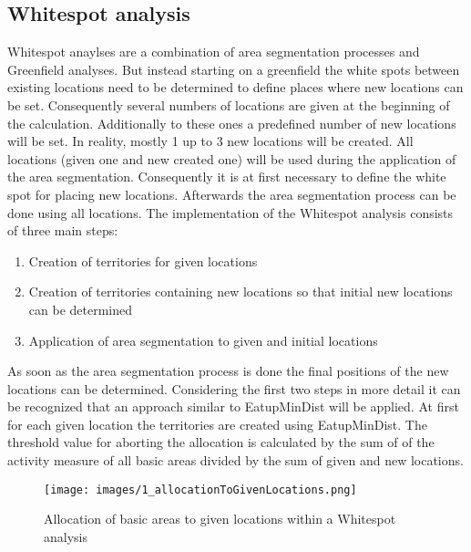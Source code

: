\subsection{Whitespot analysis}

Whitespot anaylses are a combination of area segmentation processes and Greenfield analyses. But instead starting on a greenfield the white spots between existing locations need to be determined to define places where new locations can be set. Consequently several numbers of locations are given at the beginning of the calculation. Additionally to these ones a predefined number of new locations will be set. In reality, mostly 1 up to 3 new locations will be created. All locations (given one and new created one) will be used during the application of the area segmentation. Consequently it is at first necessary to define the white spot for placing new locations. Afterwards the area segmentation process can be done using all locations. The implementation of the Whitespot analysis consists of three main steps:

\begin{enumerate}
	\item Creation of territories for given locations
	\item Creation of territories containing new locations so that initial new locations can be determined
	\item Application of area segmentation to given and initial locations
\end{enumerate}

As soon as the area segmentation process is done the final positions of the new locations can be determined. Considering the first two steps in more detail it can be recognized that an approach similar to EatupMinDist will be applied. At first for each given location the territories are created using EatupMinDist. The threshold value for aborting the allocation is calculated by the sum of of the activity measure of all basic areas divided by the sum of given and new locations.

\begin{figure}[H]
	\centering
	\texttt{[image: images/1\_allocationToGivenLocations.png]}
	\caption{Allocation of basic areas to given locations within a Whitespot analysis}
\end{figure}

